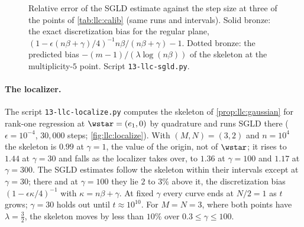 \begin{refsection}
\begin{figure}[t]
\centering
{}
\caption{Relative error of the SGLD estimate against the step size at three of the points of \cref{tab:llc:calib} (same runs and intervals). Solid bronze: the exact discretization bias for the regular plane, $(1-\epsilon(n\beta+\gamma)/4)^{-1}n\beta/(n\beta+\gamma)-1$. Dotted bronze: the predicted bias $-(m-1)/(\lambda\log(n\beta))$ of the skeleton at the multiplicity-$5$ point. Script \texttt{13-llc-sgld.py}.}\label{fig:llc:steps}
\end{figure}

\paragraph{The localizer.} The script \texttt{13-llc-localize.py} computes the skeleton of \cref{prop:llc:gaussian} for rank-one regression at $\wstar=(e_1,0)$ by quadrature and runs SGLD there ($\epsilon=10^{-4}$, $30{,}000$ steps; \cref{fig:llc:localize}). With $(M,N)=(3,2)$ and $n=10^4$ the skeleton is $0.99$ at $\gamma=1$, the value of the origin, not of $\wstar$; it rises to $1.44$ at $\gamma=30$ and falls as the localizer takes over, to $1.36$ at $\gamma=100$ and $1.17$ at $\gamma=300$. The SGLD estimates follow the skeleton within their intervals except at $\gamma=30$; there and at $\gamma=100$ they lie $2$ to $3\%$ above it, the discretization bias $(1-\epsilon\kappa/4)^{-1}$ with $\kappa=n\beta+\gamma$. At fixed $\gamma$ every curve ends at $N/2=1$ as $t$ grows; $\gamma=30$ holds out until $t\approx10^{10}$. For $M=N=3$, where both points have $\lambda=\tfrac32$, the skeleton moves by less than $10\%$ over $0.3\le\gamma\le100$.


\end{refsection}
